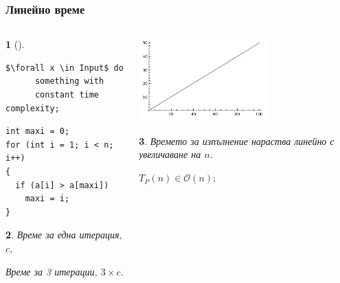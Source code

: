 \documentclass{beamer}
\newtheorem*{remark}{}
\begin{document}
\begin{frame}[fragile]
\frametitle{Линейно време}


\begin{columns}[t]
  \begin{column}{0.6\textwidth}
\begin{remark}[]
  \begin{lstlisting}[mathescape]
  $\forall x \in Input$ do 
      something with 
      constant time complexity;
  \end{lstlisting}
\end{remark}

\begin{flushleft}
\begin{lstlisting}
int maxi = 0;
for (int i = 1; i < n; i++)
{ 
  if (a[i] > a[maxi]) 
    maxi = i; 
}
\end{lstlisting}
\end{flushleft}

\begin{remark}
  Време за една итерация, $c$,

  Време за 3 итерации, $3\times c$.
\end{remark}


  \end{column}
  \begin{column}{0.4\textwidth}

   \includegraphics[width=5cm]{images/linearf}
    \begin{flushleft}
    \begin{remark}
      Времето за изпълнение нараства линейно с увеличаване на $n$.
 
      $T_P(n) \in \mathcal{O}(n);$
    \end{remark}
      
    \end{flushleft}


  \end{column}
\end{columns}

\end{frame}
\end{document}
